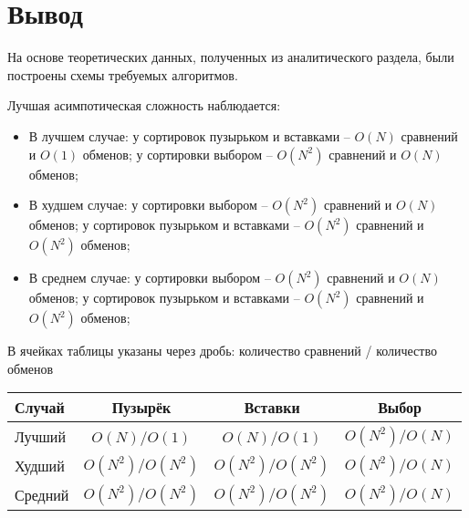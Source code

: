 \section{Вывод}

На основе теоретических данных, полученных из аналитического раздела, были построены схемы требуемых алгоритмов.

Лучшая асимпотическая сложность наблюдается:
\begin{itemize}
	\item В лучшем случае: у сортировок пузырьком и вставками -- $O(N)$ сравнений и $O(1)$ обменов; у сортировки выбором -- $O(N^2)$ сравнений и $O(N)$ обменов;
	\item В худшем случае: у сортировки выбором -- $O(N^2)$ сравнений и $O(N)$ обменов; у сортировок пузырьком и вставками -- $O(N^2)$ сравнений и $O(N^2)$ обменов;
	\item В среднем случае: у сортировки выбором -- $O(N^2)$ сравнений и $O(N)$ обменов; у сортировок пузырьком и вставками -- $O(N^2)$ сравнений и $O(N^2)$ обменов;
\end{itemize}

В ячейках таблицы указаны через дробь: количество сравнений / количество обменов
\begin{center}
	\begin{tabular}{| l | c | c | c |}
		\hline
		Случай & Пузырёк & Вставки & Выбор \\ \hline
		Лучший & $O(N)$/$O(1)$ & $O(N)$/$O(1)$ & $O(N^2)$/$O(N)$ \\ \hline
		Худший & $O(N^2)$/$O(N^2)$ & $O(N^2)$/$O(N^2)$ & $O(N^2)$/$O(N)$ \\ \hline
		Средний & $O(N^2)$/$O(N^2)$ & $O(N^2)$/$O(N^2)$ & $O(N^2)$/$O(N)$ \\
		\hline
	\end{tabular}
\end{center}
